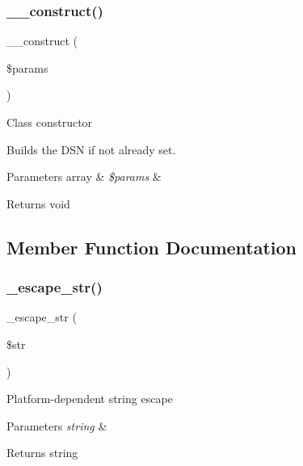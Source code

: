 \subsubsection{\texorpdfstring{\+\_\+\+\_\+construct()}{\_\_construct()}}
{\footnotesize\ttfamily \+\_\+\+\_\+construct (\begin{DoxyParamCaption}\item[{}]{\$params }\end{DoxyParamCaption})}

Class constructor

Builds the D\+SN if not already set.


\begin{DoxyParams}[1]{Parameters}
array & {\em \$params} & \\
\hline
\end{DoxyParams}
\begin{DoxyReturn}{Returns}
void 
\end{DoxyReturn}


\subsection{Member Function Documentation}
\mbox{\label{class_c_i___d_b__pdo__odbc__driver_af8ef0237bfcdb19215b63fff769e7a55}} 
\subsubsection{\texorpdfstring{\+\_\+escape\+\_\+str()}{\_escape\_str()}}
{\footnotesize\ttfamily \+\_\+escape\+\_\+str (\begin{DoxyParamCaption}\item[{}]{\$str }\end{DoxyParamCaption})\hspace{0.3cm}{\ttfamily [protected]}}

Platform-\/dependent string escape


\begin{DoxyParams}{Parameters}
{\em string} & \\
\hline
\end{DoxyParams}
\begin{DoxyReturn}{Returns}
string 
\end{DoxyReturn}
\mbox{\label{class_c_i___d_b__pdo__odbc__driver_a7ccb7f9c301fe7f0a9db701254142b63}} 
